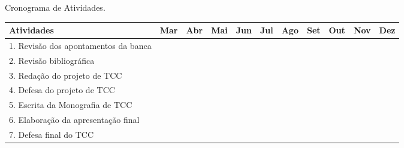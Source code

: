 \begin{quadro}[!htb]
    \centering
    \caption{Cronograma de Atividades.\label{qua:quadro1}}
    \begin{tabular}{|p{4.5cm}|p{0.7cm}|p{0.7cm}|p{0.7cm}|p{0.7cm}|p{0.7cm}|p{0.7cm}|p{0.7cm}|p{0.7cm}|p{0.7cm}|p{0.7cm}|}
        \hline
        \textbf{Atividades} & \textbf{Mar} & \textbf{Abr} & \textbf{Mai} & \textbf{Jun} & \textbf{Jul} & \textbf{Ago} & \textbf{Set} & \textbf{Out} & \textbf{Nov} & \textbf{Dez} \\
        \hline
        \small{1. Revisão dos apontamentos da banca} & \cellcolor[gray]{0.8}  &   &   &   &   &   &   &   &   &  \\
        \hline
        \small{2. Revisão bibliográfica} &   & \cellcolor[gray]{0.8} &   &   &   &   &   &   &   &  \\
        \hline
	\small{3. Redação do projeto de TCC} &   &   & \cellcolor[gray]{0.8} & \cellcolor[gray]{0.8} &   &   &   &   &   &  \\
        \hline
	\small{4. Defesa do projeto de TCC} &   &   &   &   & \cellcolor[gray]{0.8} &   &   &   &   &  \\
        \hline
	\small{5. Escrita da Monografia de TCC} &   &   &   &   &   & \cellcolor[gray]{0.8} & \cellcolor[gray]{0.8}  & \cellcolor[gray]{0.8} &   &  \\
        \hline
	\small{6. Elaboração da apresentação final} &   &   &   &   &   &   &   & \cellcolor[gray]{0.8} & \cellcolor[gray]{0.8} &  \\
        \hline
	\small{7. Defesa final do TCC} &   &   &   &   &   &   &   &   & \cellcolor[gray]{0.8} &  \\
        \hline
    \end{tabular}
\end{quadro}
